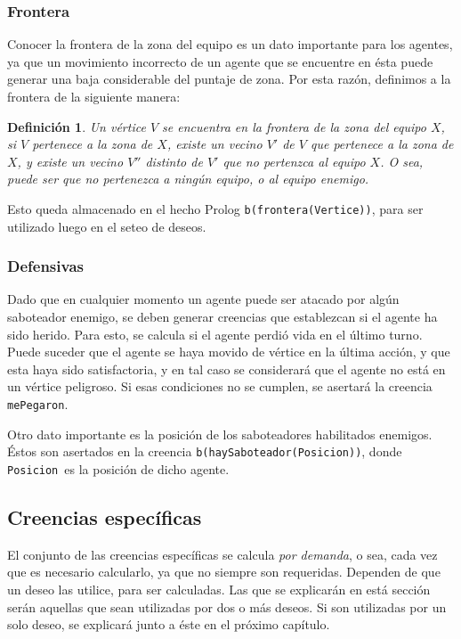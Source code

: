 \documentclass[oneside]{book}
\newtheorem{definicion}{Definición}
\begin{document}
\subsubsection{Frontera}

Conocer la frontera de la zona del equipo es un dato importante para los agentes,
ya que un movimiento incorrecto de un agente que se encuentre en ésta puede 
generar una baja considerable del puntaje de zona. Por esta razón, definimos a
la frontera de la siguiente manera:

\begin{definicion}
Un vértice $V$ se encuentra en la frontera de la zona del equipo $X$, si $V$ 
pertenece a la zona de $X$, existe un vecino $V'$ de $V$ que pertenece a la zona 
de $X$, y existe un vecino $V''$ distinto de $V'$ que no pertenzca al equipo $X$. 
O sea, puede ser que no pertenezca a ningún equipo, o al equipo enemigo.
\end{definicion}

Esto queda almacenado en el hecho Prolog \texttt{b(frontera(Vertice))}, para ser
utilizado luego en el seteo de deseos.


\subsubsection{Defensivas}

Dado que en cualquier momento un agente puede ser atacado por algún saboteador 
enemigo, se deben generar creencias que establezcan si el agente ha sido herido.
Para esto, se calcula si el agente perdió vida en el último turno. Puede suceder
que el agente se haya movido de vértice en la última acción, y que esta haya sido
satisfactoria, y en tal caso se considerará que el agente no está en un vértice
peligroso. Si esas condiciones no se cumplen, se asertará la creencia 
\texttt{mePegaron}.

Otro dato importante es la posición de los saboteadores habilitados enemigos.
Éstos son asertados en la creencia \texttt{b(haySaboteador(Posicion))}, donde 
\texttt{Posicion}\ es la posición de dicho agente.

\subsection{Creencias específicas}

El conjunto de las creencias específicas se calcula \textit{por demanda}, o sea, 
cada vez que es necesario calcularlo, ya que no siempre son requeridas. Dependen
de que un deseo las utilice, para ser calculadas. Las que se explicarán en está
sección serán aquellas que sean utilizadas por dos o más deseos. Si son 
utilizadas por un solo deseo, se explicará junto a éste en el próximo capítulo.
\end{document}
